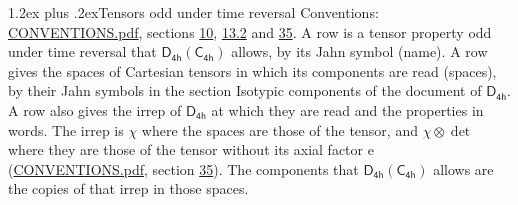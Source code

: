 \documentclass[10pt,a4paper]{article}
\makeatletter
\renewcommand\section{\@startsection{section}{1}{\z@}{-3ex plus -1ex minus -.2ex}%
  {1.2ex plus .2ex}{\normalfont\large\sffamily\bfseries\color{parttitle}}}
\numberwithin{equation}{section}
\newcommand{\grp}[1]{\mathsf{#1}}
\newcommand{\irrprod}{\otimes}
\makeatother
\begin{document}
\section{Tensors odd under time reversal}\label{s:time_odd}
Conventions: \href{../../CONVENTIONS.pdf}{CONVENTIONS.pdf}, sections \href{../../../rotation/CONVENTIONS.pdf\#conv.10}{10}, \href{../../../rotation/CONVENTIONS.pdf\#conv.13.2}{13.2} and \href{../../CONVENTIONS.pdf\#conv.35}{35}.
\leavevmode\label{n:head.name.property}A row is a tensor property odd under time reversal that $\grp{D_{4h}}(\grp{C_{4h}})$ allows, by its Jahn symbol (name). \label{n:head.spaces}A row gives the spaces of Cartesian tensors in which its components are read (spaces), by their Jahn symbols in the section Isotypic components of the document of \href{../../../rotation/data/pdf/D4h.pdf}{$\grp{D_{4h}}$}. \label{n:head.properties}A row also gives the irrep of $\grp{D_{4h}}$ at which they are read and the properties in words. The irrep is $\chi$ where the spaces are those of the tensor, and $\chi \irrprod \det$ where they are those of the tensor without its axial factor e (\href{../../CONVENTIONS.pdf}{CONVENTIONS.pdf}, section \href{../../CONVENTIONS.pdf\#conv.35}{35}). The components that $\grp{D_{4h}}(\grp{C_{4h}})$ allows are the copies of that irrep in those spaces.
\end{document}
